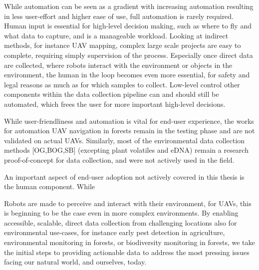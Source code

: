 

While automation can be seen as a gradient with increasing automation resulting in less user-effort and higher ease of use, full automation is rarely required. Human input is essential for high-level decision making, such as where to fly and what data to capture, and is a manageable workload. Looking at indirect methods, for instance UAV mapping, complex large scale projects are easy to complete, requiring simply supervision of the process. Especially once direct data are collected, where robots interact with the environment or objects in the environment, the human in the loop becomes even more essential, for safety and legal reasons as much as for which samples to collect. Low-level control other components within the data collection pipeline can and should still be automated, which frees the user for more important high-level decisions.



While user-friendliness and automation is vital for end-user experience, the works for automation UAV navigation in forests remain in the testing phase and are not validated on actual UAVs. Similarly, most of the environmental data collection methods [OG,BOG,SB] (excepting plant volatiles and eDNA) remain a research proof-of-concept for data collection, and were not actively used in the field.

An important aspect of end-user adoption not actively covered in this thesis is the human component. While 


Robots are made to perceive and interact with their environment, for UAVs, this is beginning to be the case even in more complex environments. By enabling accessible, scalable, direct data collection from challenging locations also for environmental use-cases, for instance early pest detection in agriculture, environmental monitoring in forests, or biodiversity monitoring in forests, we take the initial steps to providing actionable data to address the most pressing issues facing our natural world, and ourselves, today.
